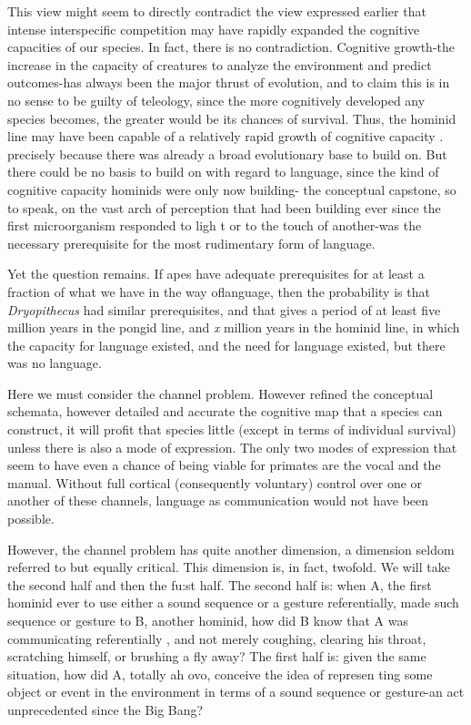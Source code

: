 This view might seem to directly contradict the view expressed
earlier that intense interspecific competition may have rapidly ex\-panded the cognitive capacities of our species. In fact, there is no contradiction. Cognitive growth-the increase in the capacity of crea\-tures to analyze the environment and predict outcomes-has always been the major thrust of evolution, and to claim this is in no sense to be guilty of teleology, since the more cognitively developed any species
becomes, the greater would be its chances of survival. Thus, the homi\-nid line may have been capable of a relatively rapid growth of cognitive capacity . precisely because there was already a broad evolutionary base to build on. But there could be no basis to build on with regard to language, since the kind of cognitive capacity hominids were only now building- the conceptual capstone, so to speak, on the vast arch of perception that had been building ever since the first microorganism responded to ligh t or to the touch of another-was the necessary prerequisite for the most rudimentary form of language.

Yet the question remains. If apes have adequate prerequisites for at least a fraction of what we have in the way oflanguage, then the probability is that \textit{Dryopithecus} had similar prerequisites, and that gives a period of at least five million years in the pongid line, and \textit{x} million years in the hominid line, in which the capacity for language existed, and the need for language existed, but there was no language.

Here we must consider the channel problem. However refined the conceptual schemata, however detailed and accurate the cognitive map that a species can construct, it will profit that species little (except in terms of individual survival) unless there is also a mode of expression. The only two modes of expression that seem to have even a chance of being viable for primates are the vocal and the manual. Without full cortical (consequently voluntary) control over one or another of these channels, language as communication would not have been possible.

However, the channel problem has quite another dimension, a dimension seldom referred to but equally critical. This dimension is, in fact, twofold. We will take the second half and then the fu:st half. The second half is: when A, the first hominid ever to use either a sound sequence or a gesture referentially, made such sequence or gesture to B, another hominid, how did B know that A was communicating referenti\-ally , and not merely coughing, clearing his throat, scratching himself, or brushing a fly away? The first half is: given the same situation, how did A, totally ah ovo, conceive the idea of represen ting some object or event in the environment in terms of a sound sequence or gesture-an act unprecedented since the Big Bang?

